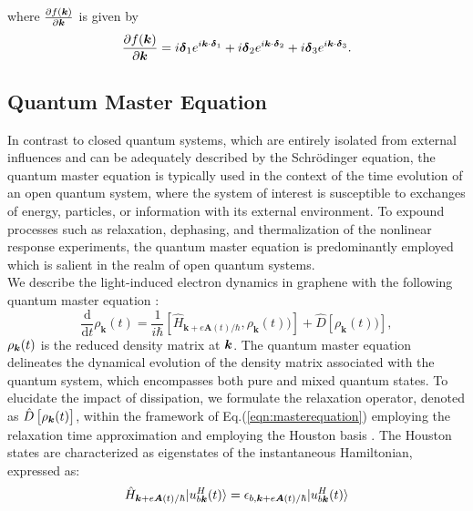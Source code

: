 where $\frac{\partial f(\boldsymbol k)}{\partial \boldsymbol k}$ is given by 
\begin{align}
\frac{\partial f(\boldsymbol k)}{\partial \boldsymbol k}=i \boldsymbol{\delta}_1e^{i\boldsymbol k \cdot \boldsymbol \delta_1}
+i \boldsymbol{\delta}_2e^{i\boldsymbol k \cdot \boldsymbol \delta_2}
+i \boldsymbol{\delta}_3e^{i\boldsymbol k \cdot \boldsymbol \delta_3}.
\end{align}
\subsection{Quantum Master Equation \label{sec:master}}
In contrast to closed quantum systems, which are entirely isolated from external influences and can be adequately described by the Schrödinger equation, the quantum master equation is typically used in the context of the time evolution of an open quantum system, where the system of interest is susceptible to exchanges of energy, particles, or information with its external environment. 
To expound processes such as relaxation, dephasing, and thermalization of the nonlinear response experiments, the quantum master equation is predominantly employed which is salient in the realm of open quantum systems.\\
We describe the light-induced electron dynamics in graphene with the following quantum master equation \cite{sato2019light,sato2019microscopic,sato2021high,sato2021nonlinear}:
\begin{equation}
\frac{\mathrm{d}}{\mathrm{d}t}\rho_{\boldsymbol{k}}(t) = \frac{1}{i \hbar}	\left[ \hat{H}_{\boldsymbol{k}+e\boldsymbol{A}(t)/\hbar}, \rho_{\boldsymbol{k}} (t)) \right] + 	
\hat{D}\left[ \rho_{\boldsymbol{k}} (t)) \right],
\label{eqn:masterequation}
\end{equation}
$\rho_{\boldsymbol k}(t)$ is the reduced density matrix at $\boldsymbol k$. The quantum master equation delineates the dynamical evolution of the density matrix associated with the quantum system, which encompasses both pure and mixed quantum states. 
To elucidate the impact of dissipation, we formulate the relaxation operator, denoted as $\hat{D}\left[\rho_{\boldsymbol{k}} (t)\right]$, within the framework of Eq.(\ref{eqn:masterequation}) employing the relaxation time approximation\cite{meier1994coherent} and employing the Houston basis \cite{PhysRev.57.184, PhysRevB.33.5494}. The Houston states are characterized as eigenstates of the instantaneous Hamiltonian, expressed as:
\begin{align}
\hat{H}_{\boldsymbol{k}+e\boldsymbol{A}(t)/\hbar} |u^H_{b\boldsymbol k}(t)\rangle = \epsilon_{b,\boldsymbol k + e\boldsymbol A(t)/\hbar}|u^H_{b\boldsymbol k}(t)\rangle   
\label{eqn:Houston}
\end{align}
